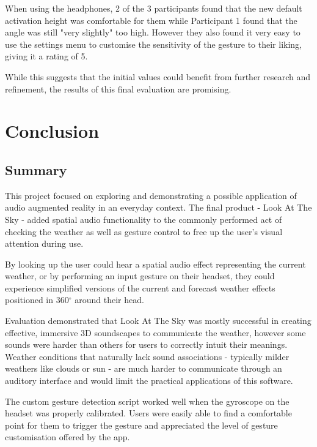 \documentclass{l4proj}
\begin{document}
When using the headphones, 2 of the 3 participants found that the new default activation height was comfortable for them while Participant 1 found that the angle was still "very slightly" too high. However they also found it very easy to use the settings menu to customise the sensitivity of the gesture to their liking, giving it a rating of 5.

While this suggests that the initial values could benefit from further research and refinement, the results of this final evaluation are promising.




\chapter{Conclusion}    

\section{Summary}
This project focused on exploring and demonstrating a possible application of audio augmented reality in an everyday context. The final product - Look At The Sky - added spatial audio functionality to the commonly performed act of checking the weather as well as gesture control to free up the user's visual attention during use.

By looking up the user could hear a spatial audio effect representing the current weather, or by performing an input gesture on their headset, they could experience simplified versions of the current and forecast weather effects positioned in 360$^\circ$ around their head. 

Evaluation demonstrated that Look At The Sky was mostly successful in creating effective, immersive 3D soundscapes to communicate the weather, however some sounds were harder than others for users to correctly intuit their meanings. Weather conditions that naturally lack sound associations - typically milder weathers like clouds or sun - are much harder to communicate through an auditory interface and would limit the practical applications of this software.

The custom gesture detection script worked well when the gyroscope on the headset was properly calibrated. Users were easily able to find a comfortable point for them to trigger the gesture and appreciated the level of gesture customisation offered by the app.
\end{document}
